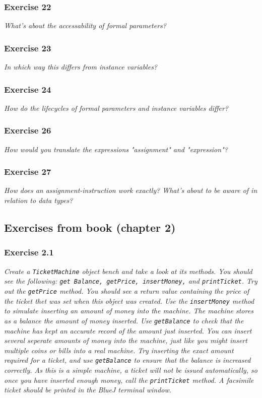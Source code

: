 \subsubsection*{Exercise 22}
\textit{What's about the accessability of formal parameters?}\\

\subsubsection*{Exercise 23}
\textit{In which way this differs from instance variables?}\\

\subsubsection*{Exercise 24}
\textit{How do the lifecycles of formal parameters and instance variables 
	differ?}\\

\subsubsection*{Exercise 26}
\textit{How would you translate the expressions "assignment" and 
	"expression"?}\\

\subsubsection*{Exercise 27}
\textit{How does an assignment-instruction work exactly? What's about to 
	be aware of in relation to data types?}\\

\subsection{Exercises from book (chapter 2)}
\subsubsection*{Exercise 2.1}
\textit{Create a \lstinline{TicketMachine} object bench and take a look at its 
methods. You should see the following: 
\lstinline{get Balance, getPrice, insertMoney,} and \lstinline{printTicket}. Try out the 
\lstinline{getPrice} method. You should see a return value containing the price of 
the ticket thet was set when this object was created. Use the 
\lstinline{insertMoney} method to simulate inserting an amount of money into the 
machine. The machine stores as a balance the amount of money inserted. Use 
\lstinline{getBalance} to check that the machine has kept an accurate record of the 
amount just inserted. You can insert several seperate amounts of money into the 
machine, just like you might insert multiple coins or bills into a real 
machine. Try inserting the exact amount required for a ticket, and use 
\lstinline{getBalance} to ensure that the balance is increased correctly. As this 
is a simple machine, a ticket will not be issued automatically, so once you 
have inserted enough money, call the \lstinline{printTicket} method. A facsimile 
ticket should be printed in the BlueJ terminal window. }

